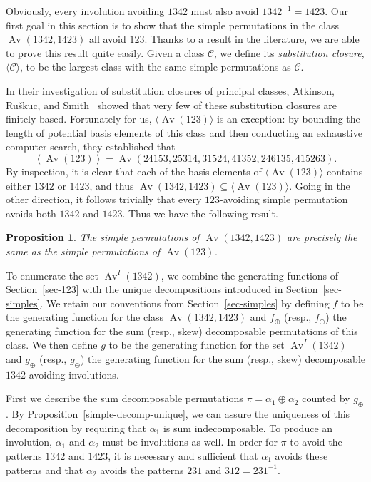 \documentclass[10pt]{article}
\theoremstyle{plain}
\newtheorem{proposition}[theorem]{Proposition}
\newcommand{\Av}{\operatorname{Av}}
\newcommand{\C}{\mathcal{C}}
\begin{document}
Obviously, every involution avoiding $1342$ must also avoid $1342^{-1}=1423$. Our first goal in this section is to show that the simple permutations in the class $\Av(1342, 1423)$ all avoid $123$. Thanks to a result in the literature, we are able to prove this result quite easily. Given a class $\C$, we define its \emph{substitution closure}, $\langle\C\rangle$, to be the largest class with the same simple permutations as $\C$.

In their investigation of substitution closures of principal classes, Atkinson, Ru\v{s}kuc, and Smith~\cite{atkinson:substitution-cl:} showed that very few of these substitution closures are finitely based.  Fortunately for us, $\langle\Av(123)\rangle$ is an exception: by bounding the length of potential basis elements of this class and then conducting an exhaustive computer search, they established that
\[
	\left\langle\Av(123)\right\rangle
	=
	\Av(24153, 25314, 31524, 41352, 246135, 415263).
\]
By inspection, it is clear that each of the basis elements of $\langle\Av(123)\rangle$ contains either $1342$ or $1423$, and thus $\Av(1342,1423)\subseteq\langle\Av(123)\rangle$. Going in the other direction, it follows trivially that every $123$-avoiding simple permutation avoids both $1342$ and $1423$. Thus we have the following result.

\begin{proposition}
\label{prop-1342-simple-involutions}
The simple permutations of $\Av(1342,1423)$ are precisely the same as the simple permutations of $\Av(123)$.
\end{proposition}

To enumerate the set $\Av^I(1342)$, we combine the generating functions of Section~\ref{sec-123} with the unique decompositions introduced in Section~\ref{sec-simples}. We retain our conventions from Section~\ref{sec-simples} by defining $f$ to be the generating function for the class $\Av(1342,1423)$ and $f_\oplus$ (resp., $f_\ominus$) the generating function for the sum (resp., skew) decomposable permutations of this class. We then define $g$ to be the generating function for the set $\Av^I(1342)$ and $g_\oplus$ (resp., $g_\ominus$) the generating function for the sum (resp., skew) decomposable $1342$-avoiding involutions.

First we describe the sum decomposable permutations $\pi=\alpha_1\oplus\alpha_2$ counted by $g_\oplus$. By Proposition~\ref{simple-decomp-unique}, we can assure the uniqueness of this decomposition by requiring that $\alpha_1$ is sum indecomposable. To produce an involution, $\alpha_1$ and $\alpha_2$ must be involutions as well. In order for $\pi$ to avoid the patterns $1342$ and $1423$, it is necessary and sufficient that $\alpha_1$ avoids these patterns and that $\alpha_2$ avoids the patterns $231$ and $312=231^{-1}$.
\end{document}
